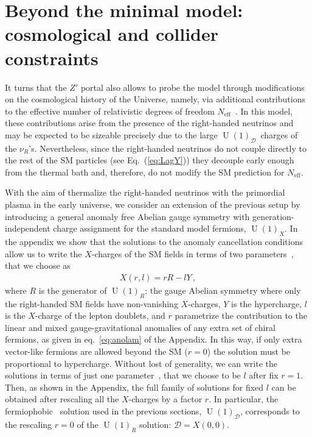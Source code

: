 \documentclass[12pt]{article}
\begin{document}

\section{Beyond the minimal model: cosmological and collider constraints}
\label{sec:CosmoConstraints}
It turns that the $Z'$ portal also allows to probe the model through modifications on the cosmological history of the Universe, namely, via additional contributions to the effective number of relativistic degrees of freedom $N_{\text{eff}}$~\cite{Dolgov:2002wy}. In this model, these contributions arise from the presence of the right-handed neutrinos and may be expected to be sizeable precisely due to the large $\operatorname{U}(1)_{\mathcal{D}}$~charges of the $\nu_R$'s.  Nevertheless, since the right-handed neutrinos do not couple directly to the rest of the SM particles (see Eq.~(\ref{eq:LagY}))  they  decouple early enough from the thermal bath and, therefore, do not modify the SM prediction for $N_{\text{eff}}$.

With the aim of thermalize the right-handed neutrinos with the
primordial plasma in the early universe, we consider an extension of
the previous setup by introducing a general anomaly free Abelian gauge
symmetry with generation-independent charge assignment for the
standard model fermions, $\operatorname{U}(1)_{X}$.
% 
In the appendix we show that the solutions to the anomaly cancellation conditions
allow us to write the $X$-charges of the SM fields in terms
of two parameters~\cite{Appelquist:2002mw,Campos:2017dgc}, that we choose as
\begin{align}
  X(r,l)=r R - l Y\,,
\end{align}
where $R$ is the generator of $\operatorname{U}(1)_R$: the gauge Abelian symmetry where only the right-handed SM fields have non-vanishing $X$-charges, $Y$ is the hypercharge, $l$ is the $X$-charge of the lepton doublets, and $r$ parametrize the contribution to the linear and mixed gauge-gravitational anomalies of any extra set of chiral fermions, as given in eq.~\eqref{eq:anolam} of the Appendix.
In this way, if only extra vector-like fermions are allowed beyond the SM ($r=0$) the solution must be proportional to hypercharge.
%
Without lost of generality, we can write the solutions in terms of just one parameter~\cite{Jenkins:1987ue,Oda:2015gna,Okada:2018tgy}, that we choose to be $l$  after fix $r=1$. Then, as shown in the Appendix, the full family of solutions for fixed $l$ can be obtained after  rescaling all the $X$-charges by a factor $r$. In particular, the fermiophobic~\cite{Campos:2017dgc,Bertuzzo:2018itn,Bertuzzo:2018ftf} solution used in the previous sections, $\operatorname{U}(1)_{\mathcal{D}}$, corresponds to the rescaling $r=0$ of the $\operatorname{U}(1)_R$ solution: $\mathcal{D}=X(0,0)$. 
\end{document}
